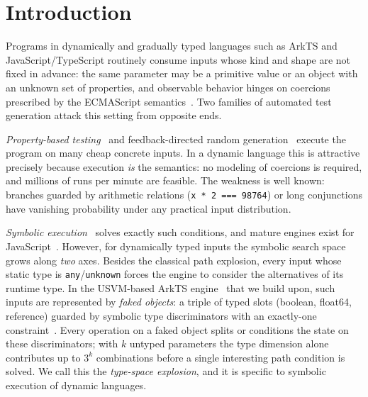 \documentclass[sigconf,nonacm,screen]{acmart}
\begin{document}
\maketitle

\section{Introduction}

Programs in dynamically and gradually typed languages such as ArkTS and
JavaScript/TypeScript routinely consume inputs whose kind and shape are not
fixed in advance: the same parameter may be a primitive value or an object
with an unknown set of properties, and observable behavior hinges on
coercions prescribed by the ECMAScript semantics~\cite{ecma262}. Two
families of automated test generation attack this setting from opposite
ends.

\emph{Property-based testing}~\cite{claessen2000,maciver2019,fastcheck}
and feedback-directed random generation~\cite{pacheco2007} execute the
program on many cheap concrete inputs. In a dynamic language this is
attractive precisely because execution \emph{is} the semantics: no modeling
of coercions is required, and millions of runs per minute are feasible.
The weakness is well known: branches guarded by arithmetic relations
(\lstinline|x * 2 === 98764|) or long conjunctions have vanishing
probability under any practical input distribution.

\emph{Symbolic execution}~\cite{king1976,cadar2013} solves exactly such
conditions, and mature engines exist for
JavaScript~\cite{javert2,santos2018,expose,loring2019,kudzu,li2023,symjs}.
However, for dynamically typed inputs the symbolic search space grows along
\emph{two} axes. Besides the classical path explosion, every input whose
static type is \lstinline|any|/\lstinline|unknown| forces the engine to
consider the alternatives of its runtime type. In the USVM-based ArkTS
engine~\cite{usvm} that we build upon, such inputs are represented by
\emph{faked objects}: a triple of typed slots (boolean, float64, reference)
guarded by symbolic type discriminators with an exactly-one
constraint~\cite{menshutin2025}. Every operation on a faked object splits
or conditions the state on these discriminators; with $k$ untyped
parameters the type dimension alone contributes up to $3^k$ combinations
before a single interesting path condition is solved. We call this the
\emph{type-space explosion}, and it is specific to symbolic execution of
dynamic languages.
\end{document}
